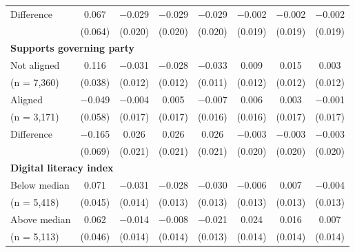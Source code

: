 \begin{tabular}[t]{lccccccc}
\hspace{1em} Difference & \num{0.067} & \num{-0.029} & \num{-0.029} & \num{-0.029} & \num{-0.002} & \num{-0.002} & \num{-0.002}\\
\hspace{2em} & (\num{0.064}) & (\num{0.020}) & (\num{0.020}) & (\num{0.020}) & (\num{0.019}) & (\num{0.019}) & (\num{0.019})\\\multicolumn{4}{l}{\textbf{Supports governing party}} \rule{0pt}{1.2\normalbaselineskip}\\
\hspace{1em} Not aligned & \num{0.116} & \num{-0.031} & \num{-0.028} & \num{-0.033} & \num{0.009} & \num{0.015} & \num{0.003}\\
\hspace{2em}(n = 7,360) & (\num{0.038}) & (\num{0.012}) & (\num{0.012}) & (\num{0.011}) & (\num{0.012}) & (\num{0.012}) & (\num{0.012})\\
\hspace{1em} Aligned & \num{-0.049} & \num{-0.004} & \num{0.005} & \num{-0.007} & \num{0.006} & \num{0.003} & \num{-0.001}\\
\hspace{2em}(n = 3,171) & (\num{0.058}) & (\num{0.017}) & (\num{0.017}) & (\num{0.016}) & (\num{0.016}) & (\num{0.017}) & (\num{0.017})\\\cmidrule(lr){2-8}
\hspace{1em} Difference & \num{-0.165} & \num{0.026} & \num{0.026} & \num{0.026} & \num{-0.003} & \num{-0.003} & \num{-0.003}\\
\hspace{2em} & (\num{0.069}) & (\num{0.021}) & (\num{0.021}) & (\num{0.021}) & (\num{0.020}) & (\num{0.020}) & (\num{0.020})\\\multicolumn{4}{l}{\textbf{Digital literacy index}} \rule{0pt}{1.2\normalbaselineskip}\\
\hspace{1em} Below median & \num{0.071} & \num{-0.031} & \num{-0.028} & \num{-0.030} & \num{-0.006} & \num{0.007} & \num{-0.004}\\
\hspace{2em}(n = 5,418) & (\num{0.045}) & (\num{0.014}) & (\num{0.013}) & (\num{0.013}) & (\num{0.013}) & (\num{0.013}) & (\num{0.013})\\
\hspace{1em} Above median & \num{0.062} & \num{-0.014} & \num{-0.008} & \num{-0.021} & \num{0.024} & \num{0.016} & \num{0.007}\\
\hspace{2em}(n = 5,113) & (\num{0.046}) & (\num{0.014}) & (\num{0.014}) & (\num{0.013}) & (\num{0.014}) & (\num{0.014}) & (\num{0.014})\\\cmidrule(lr){2-8}

\end{tabular}
